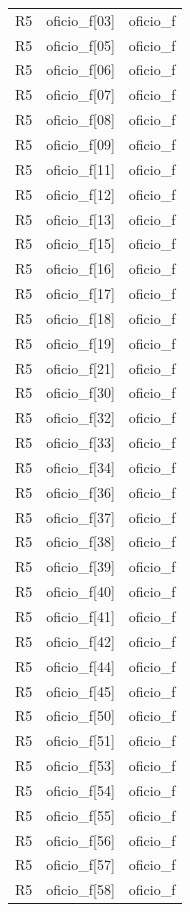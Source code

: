 \begin{longtable}{lll}
R5 & oficio\_f[03] & oficio\_f \\
R5 & oficio\_f[05] & oficio\_f \\
R5 & oficio\_f[06] & oficio\_f \\
R5 & oficio\_f[07] & oficio\_f \\
R5 & oficio\_f[08] & oficio\_f \\
R5 & oficio\_f[09] & oficio\_f \\
R5 & oficio\_f[11] & oficio\_f \\
R5 & oficio\_f[12] & oficio\_f \\
R5 & oficio\_f[13] & oficio\_f \\
R5 & oficio\_f[15] & oficio\_f \\
R5 & oficio\_f[16] & oficio\_f \\
R5 & oficio\_f[17] & oficio\_f \\
R5 & oficio\_f[18] & oficio\_f \\
R5 & oficio\_f[19] & oficio\_f \\
R5 & oficio\_f[21] & oficio\_f \\
R5 & oficio\_f[30] & oficio\_f \\
R5 & oficio\_f[32] & oficio\_f \\
R5 & oficio\_f[33] & oficio\_f \\
R5 & oficio\_f[34] & oficio\_f \\
R5 & oficio\_f[36] & oficio\_f \\
R5 & oficio\_f[37] & oficio\_f \\
R5 & oficio\_f[38] & oficio\_f \\
R5 & oficio\_f[39] & oficio\_f \\
R5 & oficio\_f[40] & oficio\_f \\
R5 & oficio\_f[41] & oficio\_f \\
R5 & oficio\_f[42] & oficio\_f \\
R5 & oficio\_f[44] & oficio\_f \\
R5 & oficio\_f[45] & oficio\_f \\
R5 & oficio\_f[50] & oficio\_f \\
R5 & oficio\_f[51] & oficio\_f \\
R5 & oficio\_f[53] & oficio\_f \\
R5 & oficio\_f[54] & oficio\_f \\
R5 & oficio\_f[55] & oficio\_f \\
R5 & oficio\_f[56] & oficio\_f \\
R5 & oficio\_f[57] & oficio\_f \\
R5 & oficio\_f[58] & oficio\_f \\

\end{longtable}
